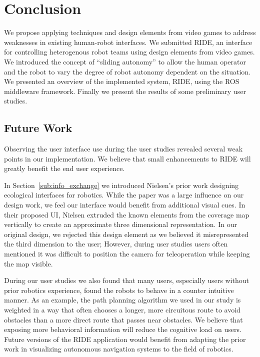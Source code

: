 \chapter{Conclusion}

We propose applying techniques and design elements from video games to address weaknesses in existing human-robot interfaces. We submitted RIDE, an interface for controlling heterogenous robot teams using design elements from video games. We introduced the concept of ``sliding autonomy'' to allow the human operator and the robot to vary the degree of robot autonomy dependent on the situation. We presented an overview of the implemented system, RIDE, using the ROS middleware framework. Finally we present the results of some preliminary user studies.

\section{Future Work}
\label{section:futurework}
Observing the user interface use during the user studies revealed several weak points in our implementation. We believe that small enhancements to RIDE will greatly benefit the end user experience.

In Section~\ref{sub:info_exchange} we introduced Nielsen's prior work designing ecological interfaces for robotics. While the paper was a large influence on our design work, we feel our interface would benefit from additional visual cues. In their proposed UI, Nielsen extruded the known elements from the coverage map vertically to create an approximate three dimensional representation. \cite{Nielsen_Teleoperation} In our original design, we rejected this design element as we believed it misrepresented the third dimension to the user; However, during user studies users often mentioned it was difficult to position the camera for teleoperation while keeping the map visible.

During our user studies we also found that many users, especially users without prior robotics experience, found the robots to behave in a counter intuitive manner. As an example, the path planning algorithm we used in our study is weighted in a way that often chooses a longer, more circuitous route to avoid obstacles than a more direct route that passes near obstacles. We believe that exposing more behavioral information will reduce the cognitive load on users. Future versions of the RIDE application would benefit from adapting the prior work in visualizing autonomous navigation systems to the field of robotics.

